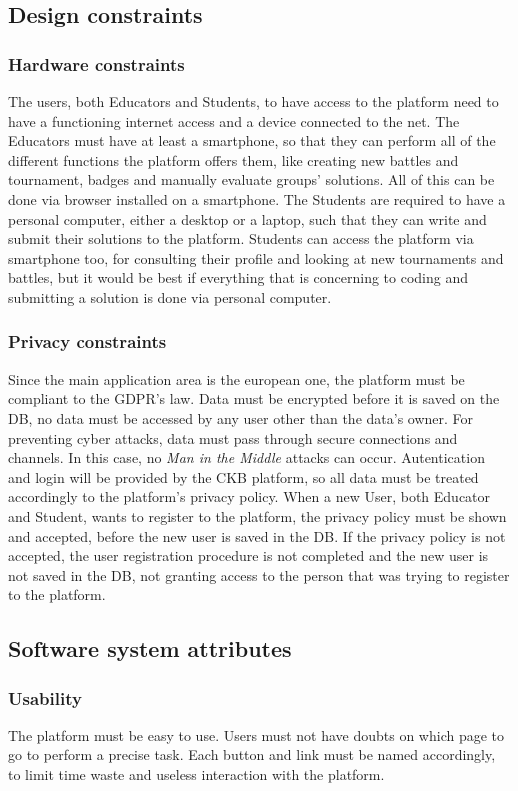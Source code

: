 \documentclass{article}
\begin{document}
{\subsection{Design constraints}
\subsubsection{Hardware constraints}
The users, both Educators and Students, to have access to the platform need to have a functioning internet access and a device connected to the net.
The Educators must have at least a smartphone, so that they can perform all of the different functions the platform offers them, like creating new battles
and tournament, badges and manually evaluate groups' solutions. All of this can be done via browser installed on a smartphone.
The Students are required to have a personal computer, either a desktop or a laptop, such that they can write and submit their solutions to the platform.
Students can access the platform via smartphone too, for consulting their profile and looking at new tournaments and battles, but it would be
best if everything that is concerning to coding and submitting a solution is done via personal computer.
\subsubsection{Privacy constraints}
Since the main application area is the european one, the platform must be compliant to the GDPR's law.
Data must be encrypted before it is saved on the DB, no data must be accessed by any user other than the data's owner.
For preventing cyber attacks, data must pass through secure connections and channels. In this case, no \textit{Man in the Middle} attacks can occur.
Autentication and login will be provided by the CKB platform, so all data must be treated accordingly to the platform's privacy policy.
When a new User, both Educator and Student, wants to register to the platform, the privacy policy must be shown and 
accepted, before the new user is saved in the DB.
If the privacy policy is not accepted, the user registration procedure is not completed and
 the new user is not saved in the DB, not granting access to the person that was
trying to register to the platform.
\subsection{Software system attributes}
\subsubsection{Usability}
The platform must be easy to use. Users must not have doubts on which page to go to perform a precise task.
Each button and link must be named accordingly, to limit time waste and useless interaction with the platform.
}
\end{document}
